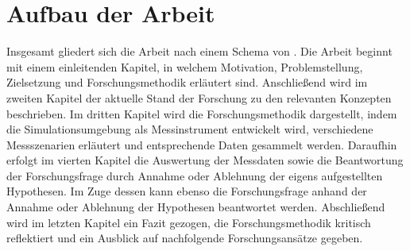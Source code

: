 \section{Aufbau der Arbeit}

Insgesamt gliedert sich die Arbeit nach einem Schema von \cite[]{Holzweiig.2022}.
Die Arbeit beginnt mit einem einleitenden Kapitel, in welchem Motivation, Problemstellung, Zielsetzung und Forschungsmethodik erläutert sind.
Anschließend wird im zweiten Kapitel der aktuelle Stand der Forschung zu den relevanten Konzepten beschrieben.
Im dritten Kapitel wird die Forschungsmethodik dargestellt, indem die Simulationsumgebung als Messinstrument entwickelt wird, verschiedene Messszenarien erläutert und entsprechende Daten gesammelt werden. 
Daraufhin erfolgt im vierten Kapitel die Auswertung der Messdaten sowie die Beantwortung der Forschungsfrage durch Annahme oder Ablehnung der eigens aufgestellten Hypothesen.
Im Zuge dessen kann ebenso die Forschungsfrage anhand der Annahme oder Ablehnung der Hypothesen beantwortet werden.
Abschließend wird im letzten Kapitel ein Fazit gezogen, die Forschungsmethodik kritisch reflektiert und ein Ausblick auf nachfolgende Forschungsansätze gegeben.